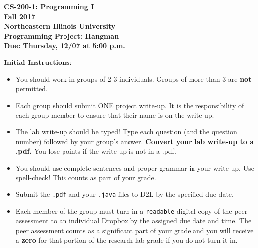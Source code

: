 \documentclass[12pt]{article}
\begin{document}
\begin{center}
	\textbf{CS-200-1: Programming I}\\
	\textbf{Fall 2017}\\
	\textbf{Northeastern Illinois University}\\
	\textbf{Programming Project: Hangman}\\
	\textbf{Due: Thursday, 12/07 at 5:00 p.m.}
\end{center}

\vspace*{0.5cm}
\vspace*{0.5cm}
\noindent\textbf{Initial Instructions:}
\begin{itemize}
	\item You should work in groups of 2-3 individuals. Groups of more than 3 are \textbf{not} permitted.
	\item Each group should submit ONE project write-up. It is the responsibility of each group member to ensure that their name is on the write-up.
	\item The lab write-up should be typed! Type each question (and the question number) followed by your group's answer. \textbf{Convert your lab write-up to a .pdf.} You lose points if the write up is not in a .pdf.
	\item You should use complete sentences and proper grammar in your write-up. Use spell-check! This counts as part of your grade.
	\item Submit the \texttt{.pdf} and your \texttt{.java} files to D2L by the specified due date.
	\item Each member of the group must turn in a \texttt{readable} digital copy of the peer assessment to an individual Dropbox by the assigned due date and time. The peer assessment counts as a significant part of your grade and you will receive a \textbf{zero} for that portion of the research lab grade if you do not turn it in.
	\\ 
\end{itemize}
\end{document}

